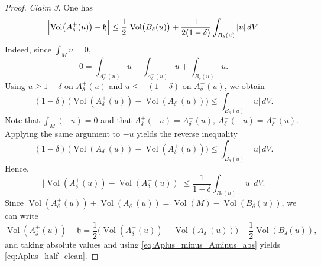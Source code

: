 \documentclass[10pt,a4paper]{amsart}
\begin{document}
\begin{proof}
\smallskip
\noindent\emph{Claim 3.} One has
\begin{equation}\label{eq:Aplus_half_clean}
\Bigl|\operatorname{Vol}\bigl(A^+_\delta(u)\bigr)-\mathfrak h\Bigr|
\le \frac12\,\operatorname{Vol}\bigl(B_\delta(u)\bigr)+\frac{1}{2(1-\delta)}\int_{B_\delta(u)}|u|\,dV.
\end{equation}
Indeed, since $\int_M u=0$,
\[
0=\int_{A^+_\delta(u)}u+\int_{A^-_\delta(u)}u+\int_{B_\delta(u)}u.
\]
Using $u\ge 1-\delta$ on $A^+_\delta(u)$ and $u\le -(1-\delta)$ on $A^-_\delta(u)$, we obtain
\begin{equation}
(1-\delta)\,\bigl(\operatorname{Vol}(A^+_\delta(u))-\operatorname{Vol}(A^-_\delta(u))\bigr)
\le \int_{B_\delta(u)}|u|\,dV.
\end{equation}
Note that $\int_M (-u)=0$ and that
$A^+_\delta(-u)=A^-_\delta(u)$, $A^-_\delta(-u)=A^+_\delta(u)$. Applying the same argument to $-u$ yields the reverse inequality
\[
(1-\delta)\,\bigl(\operatorname{Vol}(A^-_\delta(u))-\operatorname{Vol}(A^+_\delta(u))\bigr)
\le \int_{B_\delta(u)}|u|\,dV.
\]
Hence,
\begin{equation}\label{eq:Aplus_minus_Aminus_abs}
\bigl|\operatorname{Vol}(A^+_\delta(u))-\operatorname{Vol}(A^-_\delta(u))\bigr|
\le \frac{1}{1-\delta}\int_{B_\delta(u)}|u|\,dV.
\end{equation}
Since $\operatorname{Vol}(A^+_\delta(u))+\operatorname{Vol}(A^-_\delta(u))=\operatorname{Vol}(M)-\operatorname{Vol}(B_\delta(u))$, we can write
\[
\operatorname{Vol}(A^+_\delta(u))-\mathfrak h
=\frac12\bigl(\operatorname{Vol}(A^+_\delta(u))-\operatorname{Vol}(A^-_\delta(u))\bigr)-\frac12\operatorname{Vol}(B_\delta(u)),
\]
and taking absolute values and using \eqref{eq:Aplus_minus_Aminus_abs} yields \eqref{eq:Aplus_half_clean}.


\end{proof}
\end{document}
